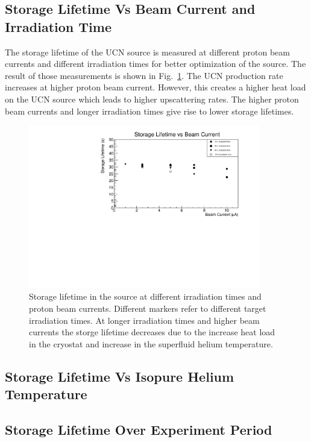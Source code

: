 \subsection{Storage Lifetime Vs Beam Current and Irradiation Time}
The storage lifetime of the UCN source is measured at different proton
beam currents and different irradiation times for better
optimization of the source. The result of those measurements is shown in
Fig.~\ref{fig:storage_beam_irrad}. The UCN production rate increases
at higher proton beam current. However, this creates a higher heat
load on the UCN source which leads to higher upscattering rates. The
higher proton beam currents and longer irradiation times give rise to
lower storage lifetimes.

\begin{figure}[h!]
  \centering
  \includegraphics[width=0.9\textwidth]{StorageLifetime_17009_and_17009A.pdf}
  \caption{Storage lifetime in the source at different irradiation
    times and proton beam currents. Different markers refer to
    different target irradiation times. At longer irradiation times
    and higher beam currents the storge lifetime decreases due to the
    increase heat load in the cryostat and increase in the superfluid
    helium temperature. }
  \label{fig:storage_beam_irrad}
\end{figure}


\subsection{Storage Lifetime Vs Isopure Helium Temperature}

\subsection{Storage Lifetime Over Experiment Period}


